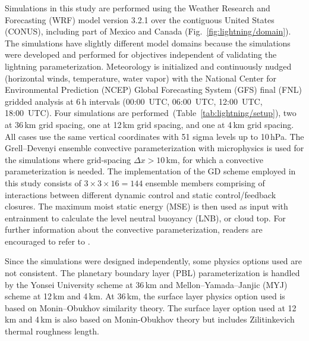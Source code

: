 
Simulations in this study are performed using the Weather Research and
Forecasting (WRF) model version 3.2.1 \citep{Skamarock:2008xx} over the
contiguous United States (CONUS), including part of Mexico and Canada
(Fig.~\ref{fig:lightning/domain}). The simulations have slightly different model
domains because the simulations were developed and performed for objectives
independent of validating the lightning parameterization. Meteorology is
initialized and continuously nudged (horizontal winds, temperature, water
vapor) with the National Center for Environmental Prediction (NCEP) Global
Forecasting System (GFS) final (FNL) gridded analysis at 6\,h intervals
(00:00~UTC, 06:00~UTC, 12:00~UTC, 18:00~UTC).
Four simulations are performed~(Table~\ref{tab:lightning/setup}),
two at 36\,\unit{km} grid spacing, one at 12\,\unit{km} grid spacing, and one
at 4\,\unit{km} grid spacing. All cases use the same vertical coordinates
with 51 sigma levels up to 10\,\unit{hPa}. The Grell--Devenyi ensemble
convective parameterization \citep{Grell:2002bs} with \citet{Thompson:2008vn}
microphysics is used for the simulations where grid-spacing $\Delta x >
10$\,km, for which a convective parameterization is needed. The
implementation of the GD scheme employed in this study consists of $3 \times
3 \times 16=144$ ensemble members comprising of interactions between
different dynamic control and static control/feedback closures. The maximum
moist static energy (MSE) is then used as input with entrainment to calculate
the level neutral buoyancy (LNB), or cloud top. For further information about
the convective parameterization, readers are encouraged to refer to
\citet{Grell:1993dz}.

Since the simulations were designed independently, some physics options used
are not consistent. The planetary \mbox{boundary} layer (PBL) parameterization is
handled by the Yonsei University scheme \citep{Hong:2006fk} at 36\,\unit{km}
and Mellon--Yamada--Janjic (MYJ) scheme \citep{Janjic:1994fk} at 12\,\unit{km}
and 4\,\unit{km}. At 36\,\unit{km}, the surface layer physics option used is
based on Monin--Obukhov similarity theory. The surface layer option used at
12\,\unit{km} and 4\,\unit{km} is also based on Monin-Obukhov theory but
includes Zilitinkevich thermal roughness length.

